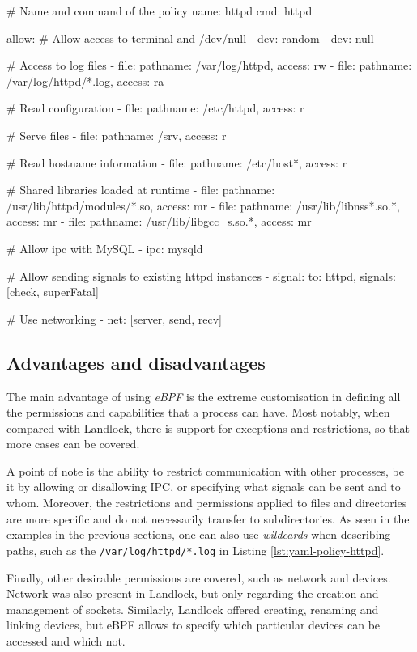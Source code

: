 \begin{code}[language=yaml, caption=A policy for HTTPD., label=lst:yaml-policy-httpd]
# Name and command of the policy
name: httpd
cmd: httpd

allow:
  # Allow access to terminal and /dev/null
  - dev: random
  - dev: null

  # Access to log files
  - file: {pathname: /var/log/httpd, access: rw}
  - file: {pathname: /var/log/httpd/*.log, access: ra}

  # Read configuration
  - file: {pathname: /etc/httpd, access: r}

  # Serve files
  - file: {pathname: /srv, access: r}

  # Read hostname information
  - file: {pathname: /etc/host*, access: r}

  # Shared libraries loaded at runtime
  - file: {pathname: /usr/lib/httpd/modules/*.so,
           access: mr}
  - file: {pathname: /usr/lib/libnss*.so.*, access: mr}
  - file: {pathname: /usr/lib/libgcc_s.so.*, access: mr}

  # Allow ipc with MySQL
  - ipc: mysqld

  # Allow sending signals to existing httpd instances
  - signal: {to: httpd, signals: [check, superFatal]}

  # Use networking
  - net: [server, send, recv]
\end{code}

\subsection{Advantages and disadvantages}

The main advantage of using \textit{eBPF} is the extreme customisation in defining all the
permissions and capabilities that a process can have. Most notably, when compared with Landlock,
there is support for exceptions and restrictions, so that more cases can be covered.

A point of note is the ability to restrict communication with other processes, be it by allowing
or disallowing IPC, or specifying what signals can be sent and to whom.
Moreover, the restrictions and permissions applied to files and directories are more specific and do not
necessarily transfer to subdirectories. As seen in the examples in the previous sections,
one can also use \textit{wildcards} when describing paths, such as the \texttt{/var/log/httpd/*.log}
in Listing \ref{lst:yaml-policy-httpd}.

Finally, other desirable permissions are covered, such as network and devices. Network was also present
in Landlock, but only regarding the creation and management of sockets. Similarly, Landlock offered
creating, renaming and linking devices, but eBPF allows to specify which particular devices can be accessed
and which not.


